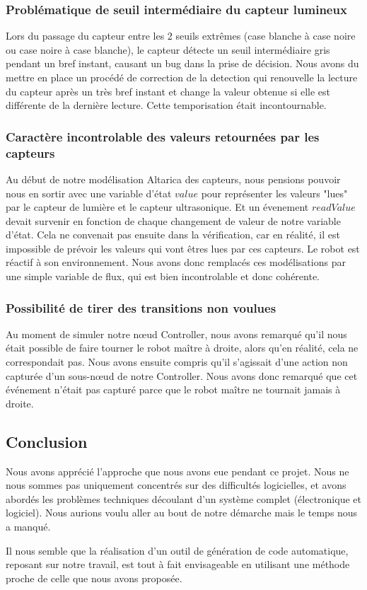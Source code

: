\subsubsection{Problématique de seuil intermédiaire du capteur lumineux}

Lors du passage du capteur entre les 2 seuils extrêmes (case blanche à case noire ou case noire à case blanche), le capteur détecte un seuil intermédiaire gris pendant un bref instant, causant un bug dans la prise de décision. Nous avons du mettre en place un procédé de correction de la detection qui renouvelle la lecture du capteur après un très bref instant et change la valeur obtenue si elle est différente de la dernière lecture. Cette temporisation était incontournable.

\subsubsection{Caractère incontrolable des valeurs retournées par les capteurs}

Au début de notre modélisation Altarica des capteurs, nous pensions pouvoir nous en sortir avec une variable d'état $value$ pour représenter les valeurs "lues" par le capteur de lumière et le capteur ultrasonique. Et un évenement $readValue$ devait survenir en fonction de chaque changement de valeur de notre variable d'état. Cela ne convenait pas ensuite dans la vérification, car en réalité, il est impossible de prévoir les valeurs qui vont \^{e}tres lues par ces capteurs. Le robot est réactif à son environnement. Nous avons donc remplacés ces modélisations par une simple variable de flux, qui est bien incontrolable et donc cohérente.

\subsubsection{Possibilité de tirer des transitions non voulues}

Au moment de simuler notre n\oe{}ud Controller, nous avons remarqué qu'il nous était possible de faire tourner le robot maître à droite, alors qu'en réalité, cela ne correspondait pas. Nous avons ensuite compris qu'il s'agissait d'une action non capturée d'un sous-n\oe{}ud de notre Controller. Nous avons donc remarqué que cet événement n'était pas capturé parce que le robot maître ne tournait jamais à droite.

\subsection{Conclusion}

Nous avons apprécié l'approche que nous avons eue pendant ce projet. Nous ne nous sommes pas uniquement concentrés sur des difficultés logicielles, et avons abordés les problèmes techniques découlant d'un système complet (électronique et logiciel). Nous aurions voulu aller au bout de notre démarche mais le temps nous a manqué.

Il nous semble que la réalisation d'un outil de génération de code automatique, reposant sur notre travail, est tout à fait envisageable en utilisant une méthode proche de celle que nous avons proposée.
